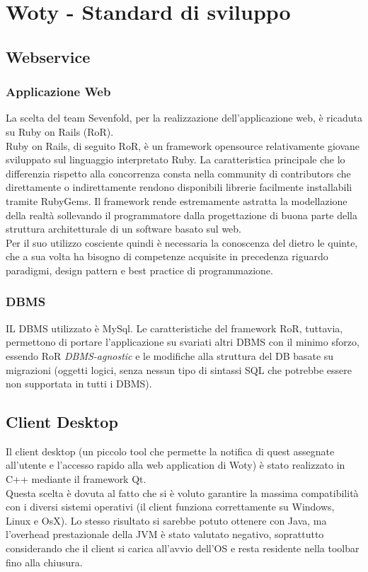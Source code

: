 \section{Woty - Standard di sviluppo}

\subsection{Webservice}
\subsubsection{Applicazione Web}
La scelta del team Sevenfold, per la realizzazione dell'applicazione web, è ricaduta su Ruby on Rails (RoR).\\
Ruby on Rails, di seguito RoR, è un framework opensource relativamente giovane sviluppato sul linguaggio interpretato Ruby. La caratteristica principale che lo differenzia rispetto alla concorrenza consta nella community di contributors che direttamente o indirettamente rendono disponibili librerie facilmente installabili tramite RubyGems. Il framework rende estremamente astratta la modellazione della realtà sollevando il programmatore dalla progettazione di buona parte della struttura architetturale di un software basato sul web. 
\\Per il suo utilizzo cosciente quindi è necessaria la conoscenza del dietro le quinte, che a sua volta ha bisogno di competenze acquisite in precedenza riguardo paradigmi, design pattern e best practice di programmazione.
\subsubsection{DBMS}
IL DBMS utilizzato è MySql. Le caratteristiche del framework RoR, tuttavia, permettono di portare l'applicazione su svariati altri DBMS con il minimo sforzo, essendo RoR \emph{DBMS-agnostic} e le modifiche alla struttura del DB basate su migrazioni (oggetti logici, senza nessun tipo di sintassi SQL che potrebbe essere non supportata in tutti i DBMS).

\subsection{Client Desktop}
Il client desktop (un piccolo tool che permette la notifica di quest assegnate all'utente e l'accesso rapido alla web application di Woty) è stato realizzato in C++ mediante il framework Qt.\\
Questa scelta è dovuta al fatto che si è voluto garantire la massima compatibilità con i diversi sistemi operativi (il client funziona correttamente su Windows, Linux e OsX). Lo stesso risultato si sarebbe potuto ottenere con Java, ma l'overhead prestazionale della JVM è stato valutato negativo, soprattutto considerando che il client si carica all'avvio dell'OS e resta residente nella toolbar fino alla chiusura. 


